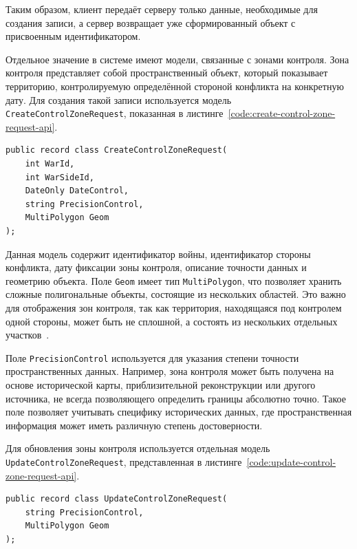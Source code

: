 Таким образом, клиент передаёт серверу только данные, необходимые для создания записи, а сервер возвращает уже сформированный объект с присвоенным идентификатором.

Отдельное значение в системе имеют модели, связанные с зонами контроля. Зона контроля представляет собой пространственный объект, который показывает территорию, контролируемую определённой стороной конфликта на конкретную дату. Для создания такой записи используется модель \texttt{CreateControlZoneRequest}, показанная в листинге~\ref{code:create-control-zone-request-api}.

\begin{code}
\label{code:create-control-zone-request-api}
\vspace{-0.75cm}
\begin{verbatim}
public record class CreateControlZoneRequest(
    int WarId,
    int WarSideId,
    DateOnly DateControl,
    string PrecisionControl,
    MultiPolygon Geom
);
\end{verbatim}
\end{code}

Данная модель содержит идентификатор войны, идентификатор стороны конфликта, дату фиксации зоны контроля, описание точности данных и геометрию объекта. Поле \texttt{Geom} имеет тип \texttt{MultiPolygon}, что позволяет хранить сложные полигональные объекты, состоящие из нескольких областей. Это важно для отображения зон контроля, так как территория, находящаяся под контролем одной стороны, может быть не сплошной, а состоять из нескольких отдельных участков~\cite{npgsql_postgis_nts}.

Поле \texttt{PrecisionControl} используется для указания степени точности пространственных данных. Например, зона контроля может быть получена на основе исторической карты, приблизительной реконструкции или другого источника, не всегда позволяющего определить границы абсолютно точно. Такое поле позволяет учитывать специфику исторических данных, где пространственная информация может иметь различную степень достоверности.

Для обновления зоны контроля используется отдельная модель \texttt{UpdateControlZoneRequest}, представленная в листинге~\ref{code:update-control-zone-request-api}.

\begin{code}
\label{code:update-control-zone-request-api}
\vspace{-0.75cm}
\begin{verbatim}
public record class UpdateControlZoneRequest(
    string PrecisionControl,
    MultiPolygon Geom
);
\end{verbatim}
\end{code}

